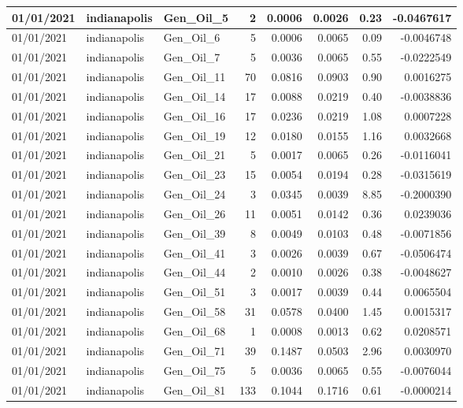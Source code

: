\documentclass[
  letterpaper,
  DIV=11,
  numbers=noendperiod]{scrartcl}
\begin{document}
\begin{tabular}{l|l|l|r|r|r|r|r}
\hline
01/01/2021 & indianapolis & Gen\_Oil\_5 & 2 & 0.0006 & 0.0026 & 0.23 & -0.0467617\\
\hline
01/01/2021 & indianapolis & Gen\_Oil\_6 & 5 & 0.0006 & 0.0065 & 0.09 & -0.0046748\\
\hline
01/01/2021 & indianapolis & Gen\_Oil\_7 & 5 & 0.0036 & 0.0065 & 0.55 & -0.0222549\\
\hline
01/01/2021 & indianapolis & Gen\_Oil\_11 & 70 & 0.0816 & 0.0903 & 0.90 & 0.0016275\\
\hline
01/01/2021 & indianapolis & Gen\_Oil\_14 & 17 & 0.0088 & 0.0219 & 0.40 & -0.0038836\\
\hline
01/01/2021 & indianapolis & Gen\_Oil\_16 & 17 & 0.0236 & 0.0219 & 1.08 & 0.0007228\\
\hline
01/01/2021 & indianapolis & Gen\_Oil\_19 & 12 & 0.0180 & 0.0155 & 1.16 & 0.0032668\\
\hline
01/01/2021 & indianapolis & Gen\_Oil\_21 & 5 & 0.0017 & 0.0065 & 0.26 & -0.0116041\\
\hline
01/01/2021 & indianapolis & Gen\_Oil\_23 & 15 & 0.0054 & 0.0194 & 0.28 & -0.0315619\\
\hline
01/01/2021 & indianapolis & Gen\_Oil\_24 & 3 & 0.0345 & 0.0039 & 8.85 & -0.2000390\\
\hline
01/01/2021 & indianapolis & Gen\_Oil\_26 & 11 & 0.0051 & 0.0142 & 0.36 & 0.0239036\\
\hline
01/01/2021 & indianapolis & Gen\_Oil\_39 & 8 & 0.0049 & 0.0103 & 0.48 & -0.0071856\\
\hline
01/01/2021 & indianapolis & Gen\_Oil\_41 & 3 & 0.0026 & 0.0039 & 0.67 & -0.0506474\\
\hline
01/01/2021 & indianapolis & Gen\_Oil\_44 & 2 & 0.0010 & 0.0026 & 0.38 & -0.0048627\\
\hline
01/01/2021 & indianapolis & Gen\_Oil\_51 & 3 & 0.0017 & 0.0039 & 0.44 & 0.0065504\\
\hline
01/01/2021 & indianapolis & Gen\_Oil\_58 & 31 & 0.0578 & 0.0400 & 1.45 & 0.0015317\\
\hline
01/01/2021 & indianapolis & Gen\_Oil\_68 & 1 & 0.0008 & 0.0013 & 0.62 & 0.0208571\\
\hline
01/01/2021 & indianapolis & Gen\_Oil\_71 & 39 & 0.1487 & 0.0503 & 2.96 & 0.0030970\\
\hline
01/01/2021 & indianapolis & Gen\_Oil\_75 & 5 & 0.0036 & 0.0065 & 0.55 & -0.0076044\\
\hline
01/01/2021 & indianapolis & Gen\_Oil\_81 & 133 & 0.1044 & 0.1716 & 0.61 & -0.0000214\\

\end{tabular}
\end{document}
